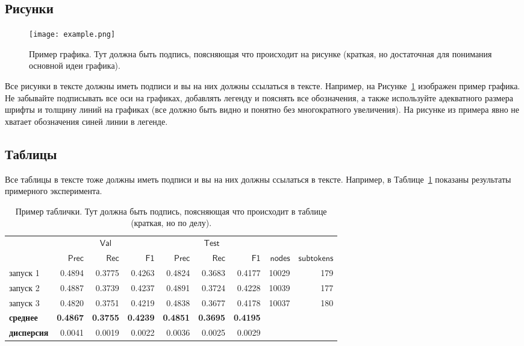 \documentclass[a4paper,12pt]{extarticle}
\begin{document}
\subsection{Рисунки}

\begin{figure}[ht]
	\centering
	\texttt{[image: example.png]}
	\caption{Пример графика. Тут должна быть подпись, поясняющая что происходит на рисунке (краткая, но достаточная для понимания основной идеи графика).}
	\label{fig:by_epochs}
\end{figure}

Все рисунки в тексте должны иметь подписи и вы на них должны ссылаться в тексте. Например, на Рисунке~\ref{fig:by_epochs} изображен пример графика. Не забывайте подписывать все оси на графиках, добавлять легенду и пояснять все обозначения, а также используйте адекватного размера шрифты и толщину линий на графиках (все должно быть видно и понятно без многократного увеличения). На рисунке из примера явно не хватает обозначения синей линии в легенде.


\subsection{Таблицы}

Все таблицы в тексте тоже должны иметь подписи и вы на них должны ссылаться в тексте. Например, в Таблице~\ref{table:long_epochs} показаны результаты примерного эксперимента. 


\begin{table}[ht]
	\caption{Пример таблички. Тут должна быть подпись, поясняющая что происходит в таблице (краткая, но по делу).}
	\label{table:long_epochs}
	\footnotesize
	\centering
	\begin{tabular}{lrrrrrrrr}
		\toprule
		& \multicolumn{3}{c}{$\mathsf{Val}$} &
		\multicolumn{3}{c}{$\mathsf{Test}$} \\
		\cmidrule(lr){2-4} \cmidrule(l){5-7} 
		{} &  $\mathsf{Prec}$ &  $\mathsf{Rec}$ &  $\mathsf{F1}$ &  $\mathsf{Prec}$ &  $\mathsf{Rec}$ &  $\mathsf{F1}$  &  $\mathsf{nodes}$ & $\mathsf{subtokens}$\\
		\midrule
		запуск 1    &    0.4894 &   0.3775 &  0.4263 &     0.4824 &    0.3683 &   0.4177 & 10029 & 179\\
		запуск 2    &    0.4887 &   0.3739 &  0.4237 &     0.4891 &    0.3724 &   0.4228 & 10039 & 177\\
		запуск 3    &    0.4820 &   0.3751 &  0.4219 &     0.4838 &    0.3677 &   0.4178 & 10037&	180\\
		\midrule
		\bf{среднее} &    \bf{0.4867} &   \bf{0.3755} &  \bf{0.4239} &    \bf{ 0.4851} &    \bf{0.3695} &   \bf{0.4195} \\
		\bf{дисперсия}  &    0.0041 &   0.0019 &  0.0022 &     0.0036 &    0.0025 &   0.0029 \\
		\bottomrule
	\end{tabular}
\end{table}
\end{document}
